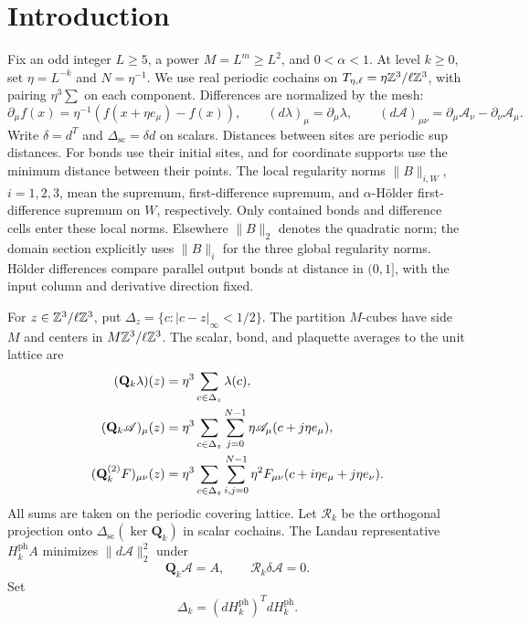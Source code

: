 \section{Introduction}\label{sec:introduction}
Fix an odd integer \(L\ge5\), a power \(M=L^m\ge L^2\), and
\(0<\alpha<1\). At level \(k\ge0\), set
\(\eta=L^{-k}\) and \(N=\eta^{-1}\).
We use real periodic cochains on
\(T_{\eta,\ell}=\eta\mathbb Z^3/\ell\mathbb Z^3\), with pairing
\(\eta^3\sum\) on each component. Differences are normalized by
the mesh:
\[
 \partial_\mu f(x)=\eta^{-1}(f(x+\eta e_\mu)-f(x)),\qquad
 (d\lambda)_\mu=\partial_\mu\lambda,\qquad
 (d\mathscr A)_{\mu\nu}
   =\partial_\mu\mathscr A_\nu-\partial_\nu\mathscr A_\mu.
\]
Write \(\delta=d^T\) and \(\Delta_{\mathrm{sc}}=\delta d\)
on scalars. Distances between sites are periodic sup distances.
For bonds use their initial sites, and for coordinate supports use
the minimum distance between their points.
The local regularity norms \(\|B\|_{i,W}\), \(i=1,2,3\), mean
the supremum, first-difference supremum, and \(\alpha\)-H\"older
first-difference supremum on \(W\), respectively. Only contained
bonds and difference cells enter these local norms.
Elsewhere \(\|B\|_2\) denotes the quadratic norm; the domain
section explicitly uses \(\|B\|_i\) for the three global
regularity norms.
H\"older differences compare parallel output bonds at distance
in \((0,1]\), with the input column and derivative direction fixed.

For \(z\in\mathbb Z^3/\ell\mathbb Z^3\), put
\(\Delta_z=\{c:|c-z|_\infty<1/2\}\).
The partition \(M\)-cubes have side \(M\) and centers in
\(M\mathbb Z^3/\ell\mathbb Z^3\).
The scalar, bond, and plaquette averages to the unit lattice are
\begin{align}
 (\mathbf Q_k\lambda)(z)
   &=\eta^3\sum_{c\in\Delta_z}\lambda(c),\notag\\
 (\mathbf Q_k\mathscr A)_\mu(z)
   &=\eta^3\sum_{c\in\Delta_z}\sum_{j=0}^{N-1}
          \eta\mathscr A_\mu(c+j\eta e_\mu),\label{eq:photon-block-averages}\\
 (\mathbf Q_k^{(2)}F)_{\mu\nu}(z)
   &=\eta^3\sum_{c\in\Delta_z}\sum_{i,j=0}^{N-1}
          \eta^2F_{\mu\nu}(c+i\eta e_\mu+j\eta e_\nu).\notag
\end{align}
All sums are taken on the periodic covering lattice.
Let \(\mathcal R_k\) be the orthogonal projection onto
\(\Delta_{\mathrm{sc}}(\ker\mathbf Q_k)\) in scalar cochains.
The Landau representative \(H_k^{\mathrm{ph}}A\) minimizes
\(\|d\mathscr A\|_2^2\) under
\begin{equation}\label{eq:photon-Landau-constraints}
 \mathbf Q_k\mathscr A=A,\qquad \mathcal R_k\delta\mathscr A=0.
\end{equation}
Set
\begin{equation}\label{eq:photon-coarse-form}
 \Delta_k=(dH_k^{\mathrm{ph}})^TdH_k^{\mathrm{ph}}.
\end{equation}

